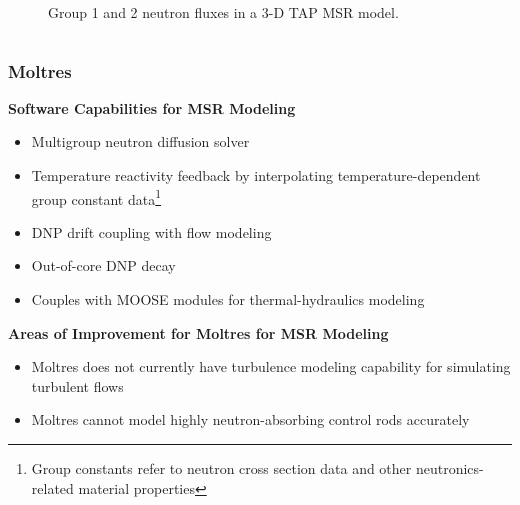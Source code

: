 \begin{frame}
\begin{columns}
\begin{figure}
        \caption{\footnotesize Group 1 and 2 neutron fluxes in a 3-D TAP MSR model.
        \cite{lee_neutronics_2020}}
      \end{figure}
    \hfill
  \end{columns}
\end{frame}

\begin{frame}
  \frametitle{Moltres}
  \begin{block}{\textbf{Software Capabilities for MSR Modeling}}
    \begin{itemize}
  	  \item Multigroup neutron diffusion solver
      \item Temperature reactivity feedback by interpolating temperature-dependent group
        constant data\footnote{Group constants refer to neutron cross section data and other
        neutronics-related material properties}
      \item \gls{DNP} drift coupling with flow modeling
      \item Out-of-core \gls{DNP} decay
      \item Couples with MOOSE modules for thermal-hydraulics modeling
    \end{itemize}
  \end{block}
  \pause
  \begin{block}{\textbf{Areas of Improvement for Moltres for MSR Modeling}}
    \begin{itemize}
      \item Moltres does not currently have turbulence modeling capability for simulating turbulent
        flows
      \item Moltres cannot model highly neutron-absorbing control rods accurately
    \end{itemize}
  \end{block}
\end{frame}
